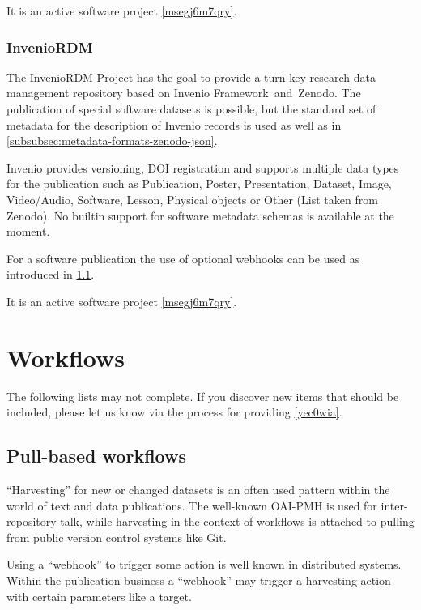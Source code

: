 \documentclass{article}
\begin{document}
It is an active software project \ref{msegj6m7qry}.



\subsubsection{InvenioRDM}\label{vym1mq9h5jxs}
The InvenioRDM Project has the goal to provide a turn-key research data management repository based on Invenio Framework and Zenodo. The publication of special software datasets is possible, but the standard set of metadata for the description of Invenio records is used as well as in \ref{subsubsec:metadata-formats-zenodo-json}.

Invenio provides versioning, DOI registration and supports multiple data types for the publication such as Publication, Poster, Presentation, Dataset, Image, Video/Audio, Software, Lesson, Physical objects or Other (List taken from Zenodo). No builtin support for software metadata schemas is available at the moment. 

For a software publication the use of optional webhooks can be used as introduced in \ref{dttj6h7jn6f}.

It is an active software project \ref{msegj6m7qry}.



\section{Workflows}\label{bq4pinu53a8}
The following lists may not complete. If you discover new items that should be included, please let us know via the process for providing \ref{yec0wia}.



\subsection{Pull-based workflows}\label{dttj6h7jn6f}
“Harvesting” for new or changed datasets is an often used pattern within the world of text and data publications. The well-known OAI-PMH is used for inter-repository talk, while harvesting in the context of workflows is attached to pulling from public version control systems like Git.

Using a “webhook” to trigger some action is well known in distributed systems. Within the publication business a “webhook” may trigger a harvesting action with certain parameters like a target.
\end{document}
